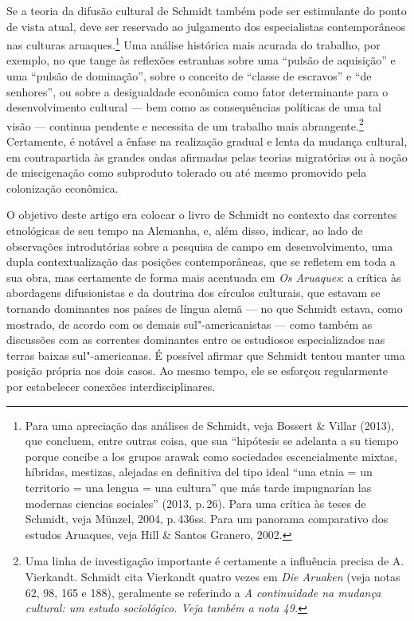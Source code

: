 Se a teoria da difusão cultural de Schmidt também pode ser estimulante
do ponto de vista atual, deve ser reservado ao julgamento dos
especialistas contemporâneos nas culturas aruaques.\footnote{Para uma
  apreciação das análises de Schmidt, veja Bossert \& Villar (2013), que
  concluem, entre outras coisa, que sua ``hipótesis se adelanta a su
  tiempo porque concibe a los grupos arawak como sociedades
  escencialmente mixtas, híbridas, mestizas, alejadas en definitiva del
  tipo ideal ``una etnia = un territorio = una lengua = una cultura'' que
  más tarde impugnarían las modernas ciencias sociales'' (2013, p.\,26).
  Para uma crítica às teses de Schmidt, veja Münzel, 2004, p.\,436ss.
  Para um panorama comparativo dos estudos Aruaques, veja Hill \& Santos
  Granero, 2002.} Uma análise histórica mais acurada do trabalho, por
exemplo, no que tange às reflexões estranhas sobre uma ``pulsão de
aquisição'' e uma ``pulsão de dominação'', sobre o conceito de ``classe
de escravos'' e ``de senhores'', ou sobre a desigualdade econômica como
fator determinante para o desenvolvimento cultural --- bem como as
consequências políticas de uma tal visão --- continua pendente e
necessita de um trabalho mais abrangente.\footnote{Uma linha de
  investigação importante é certamente a influência precisa de A.
  Vierkandt. Schmidt cita Vierkandt quatro vezes em \textit{Die Aruaken}
  (veja notas 62, 98, 165 e 188), geralmente se referindo a \textit{A
  continuidade na mudança cultural: um estudo sociológico. Veja
  também a nota 49.}} Certamente, é notável a ênfase na realização
gradual e lenta da mudança cultural, em contrapartida às grandes ondas
afirmadas pelas teorias migratórias ou à noção de miscigenação como
subproduto tolerado ou até mesmo promovido pela colonização econômica.

O objetivo deste artigo era colocar o livro de Schmidt no contexto das
correntes etnológicas de seu tempo na Alemanha, e, além disso, indicar,
ao lado de observações introdutórias sobre a pesquisa de campo em
desenvolvimento, uma dupla contextualização das posições contemporâneas,
que se refletem em toda a sua obra, mas certamente de forma mais
acentuada em \textit{Os Aruaques}: a crítica às abordagens difusionistas e
da doutrina dos círculos culturais, que estavam se tornando dominantes
nos países de língua alemã --- no que Schmidt estava, como mostrado, de
acordo com os demais sul"-americanistas --- como também as discussões com
as correntes dominantes entre os estudiosos especializados nas terras
baixas sul"-americanas. É possível afirmar que Schmidt tentou manter uma
posição própria nos dois casos. Ao mesmo tempo, ele se esforçou
regularmente por estabelecer conexões interdisciplinares.

